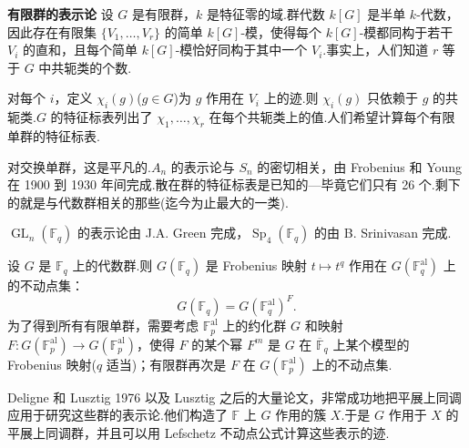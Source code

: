 \textbf{有限群的表示论} 设 $G$ 是有限群，$k$ 是特征零的域.群代数 $k[G]$ 是半单 $k$-代数，因此存在有限集 $\{V_1, \ldots, V_r\}$ 的简单 $k[G]$-模，使得每个 $k[G]$-模都同构于若干 $V_i$ 的直和，且每个简单 $k[G]$-模恰好同构于其中一个 $V_i$.事实上，人们知道 $r$ 等于 $G$ 中共轭类的个数.

对每个 $i$，定义 $\chi_i(g)$($g \in G$)为 $g$ 作用在 $V_i$ 上的迹.则 $\chi_i(g)$ 只依赖于 $g$ 的共轭类.$G$ 的特征标表列出了 $\chi_1, \ldots, \chi_r$ 在每个共轭类上的值.人们希望计算每个有限单群的特征标表.

对交换单群，这是平凡的.$A_n$ 的表示论与 $S_n$ 的密切相关，由 Frobenius 和 Young 在 1900 到 1930 年间完成.散在群的特征标表是已知的---毕竟它们只有 26 个.剩下的就是与代数群相关的那些(迄今为止最大的一类).

$\operatorname{GL}_n(\mathbb{F}_q)$ 的表示论由 J.A. Green 完成，$\operatorname{Sp}_4(\mathbb{F}_q)$ 的由 B. Srinivasan 完成.

设 $G$ 是 $\mathbb{F}_q$ 上的代数群.则 $G(\mathbb{F}_q)$ 是 Frobenius 映射 $t \mapsto t^{q}$ 作用在 $G(\mathbb{F}_q^{\mathrm{al}})$ 上的不动点集：
\[
G(\mathbb{F}_q) = G(\mathbb{F}_q^{\mathrm{al}})^{F}.
\]
为了得到所有有限单群，需要考虑 $\mathbb{F}_p^{\mathrm{al}}$ 上的约化群 $G$ 和映射 $F \colon G(\mathbb{F}_p^{\mathrm{al}}) \to G(\mathbb{F}_p^{\mathrm{al}})$，使得 $F$ 的某个幂 $F^{m}$ 是 $G$ 在 $\overline{\mathbb{F}}_q$ 上某个模型的 Frobenius 映射($q$ 适当)；有限群再次是 $F$ 在 $G(\mathbb{F}_p^{\mathrm{al}})$ 上的不动点集.

Deligne 和 Lusztig 1976 以及 Lusztig 之后的大量论文，非常成功地把平展上同调应用于研究这些群的表示论.他们构造了 $\mathbb{F}$ 上 $G$ 作用的簇 $X$.于是 $G$ 作用于 $X$ 的平展上同调群，并且可以用 Lefschetz 不动点公式计算这些表示的迹.
